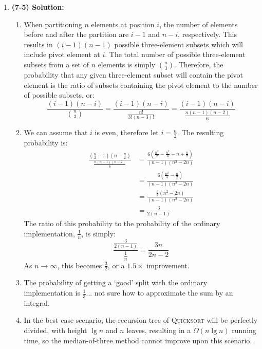 \documentclass{article}
\begin{document}
\begin{enumerate}
\item \textbf{(7-5) Solution:} 
    \begin{enumerate}
        \item When partitioning $n$ elements at position $i$, the number of elements before and after the partition are $i-1$ and $n-i$, respectively. This results in $(i-1)(n-1)$ possible three-element subsets which will include pivot element at $i$. The total number of possible three-element subsets from a set of $n$ elements is simply ${n \choose 3}$. Therefore, the probability that any given three-element subset will contain the pivot element is the ratio of subsets containing the pivot element to the number of possible subsets, or:
        $$ \frac{(i-1)(n-i)}{{n \choose 3}} = \frac{(i-1)(n-i)}{\frac{n!}{3!(n-3)!}} = \frac{(i-1)(n-i)}{\frac{n(n-1)(n-2)}{6}}$$
        \item We can assume that $i$ is even, therefore let $i=\frac{n}{2}$. The resulting probability is: 
        \begin{align*}
        \frac{(\frac{n}{2}-1)(n-\frac{n}{2})}{\frac{n(n-1)(n-2)}{6}}
        &= \frac{6(\frac{n^{2}}{2}-\frac{n^{2}}{4}-n+\frac{n}{2})}{(n-1)(n^{2}-2n)} \\
        &= \frac{6(\frac{n^{2}}{4}-\frac{n}{2})}{(n-1)(n^{2}-2n)} \\
        &= \frac{\frac{6}{4}(n^{2}-2n)}{(n-1)(n^{2}-2n)}\\
        &= \frac{3}{2(n-1)}
        \end{align*}
        The ratio of this probability to the probability of the ordinary implementation, $\frac{1}{n}$, is simply:
        $$ \frac{\frac{3}{2(n-1)}}{\frac{1}{n}} = \frac{3n}{2n-2} $$
        As $n\rightarrow \infty$, this becomes $\frac{3}{2}$, or a $1.5\times$ improvement.
        \item The probability of getting a `good' split with the ordinary implementation is $\frac{1}{3}$... not sure how to approximate the sum by an integral.
        \item In the best-case scenario, the recursion tree of \textsc{Quicksort} will be perfectly divided, with height $\lg{n}$ and $n$ leaves, resulting in a $\Omega(n\lg{n})$ running time, so the median-of-three method cannot improve upon this scenario.
    \end{enumerate}

\end{enumerate}
\end{document}

